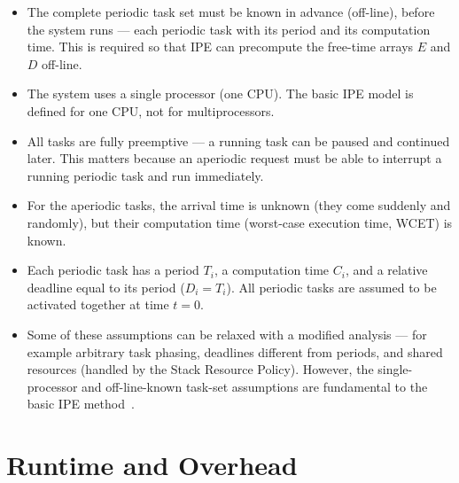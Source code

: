 \documentclass[conference]{IEEEtran}
\begin{document}
\begin{itemize}
  \item The complete periodic task set must be known in advance (off-line),
        before the system runs --- each periodic task with its period and its
        computation time. This is required so that IPE can precompute the
        free-time arrays $E$ and $D$ off-line.
  \item The system uses a single processor (one CPU). The basic IPE model is
        defined for one CPU, not for multiprocessors.
  \item All tasks are fully preemptive --- a running task can be paused and
        continued later. This matters because an aperiodic request must be
        able to interrupt a running periodic task and run immediately.
  \item For the aperiodic tasks, the arrival time is unknown (they come
        suddenly and randomly), but their computation time (worst-case
        execution time, WCET) is known.
  \item Each periodic task has a period $T_i$, a computation time $C_i$, and a
        relative deadline equal to its period ($D_i = T_i$). All periodic
        tasks are assumed to be activated together at time $t = 0$.
  \item Some of these assumptions can be relaxed with a modified analysis ---
        for example arbitrary task phasing, deadlines different from periods,
        and shared resources (handled by the Stack Resource Policy). However,
        the single-processor and off-line-known task-set assumptions are
        fundamental to the basic IPE method~\cite{buttazzo}.
\end{itemize}

\section{Runtime and Overhead}
\end{document}
